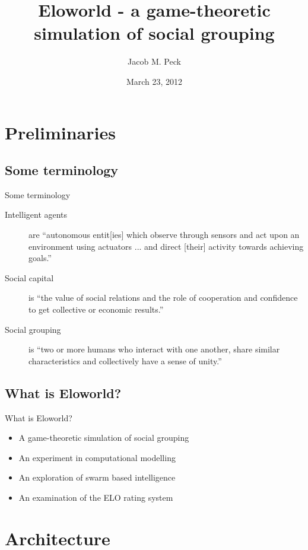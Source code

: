 \documentclass[12pt]{beamer}
\begin{document}
\title{Eloworld - a game-theoretic simulation of social grouping}
\author{Jacob M. Peck}
\date{March 23, 2012}
\maketitle

\section{Preliminaries}
\subsection{Some terminology}
\begin{frame}{Some terminology}
  \begin{description}
    \item[Intelligent agents] are ``autonomous entit[ies] which observe through sensors and act upon an environment using actuators ... and direct [their] activity towards achieving goals.''
    \item[Social capital] is ``the value of social relations and the role of cooperation and confidence to get collective or economic results.''
    \item[Social grouping] is ``two or more humans who interact with one another, share similar characteristics and collectively have a sense of unity.''
  \end{description}
\end{frame}

\subsection{What is Eloworld?}
\begin{frame}{What is Eloworld?}
  \begin{itemize}
    \item A game-theoretic simulation of social grouping 
    \item An experiment in computational modelling 
    \item An exploration of swarm based intelligence
    \item An examination of the ELO rating system
  \end{itemize}
\end{frame}

\section{Architecture}
\end{document}
